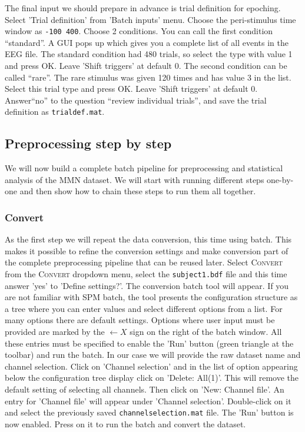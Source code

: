 The final input we should prepare in advance is trial definition for epoching. Select 'Trial definition' from 'Batch inputs' menu.  Choose the peri-stimulus time window as \texttt{-100 400}. Choose 2 conditions. You can call the first condition ``standard''. A GUI pops up which gives you a complete list of all events in the EEG file. The standard condition had 480 trials, so select the type with value 1 and press OK. Leave 'Shift triggers' at default 0. The second condition can be called ``rare''. The rare stimulus was given 120 times and has value 3 in the list. Select this trial type and press OK.  Leave 'Shift triggers' at default 0.  Answer``no'' to the question  ``review individual trials'', and  save the trial definition as \texttt{trialdef.mat}.

\subsection{Preprocessing step by step}

We will now build a complete batch pipeline for preprocessing and statistical analysis of the MMN dataset. We will start with running different steps one-by-one and then show how to chain these steps to run them all together.

\subsubsection{Convert}
As the first step we will repeat the data conversion, this time using batch. This makes it possible to refine the conversion settings and make conversion part of the complete preprocessing pipeline that can be reused later. Select \textsc{Convert} from the \textsc{Convert} dropdown menu, select the \texttt{subject1.bdf} file and this time answer 'yes' to 'Define settings?'. The conversion batch tool will appear. If you are not familiar with SPM batch, the tool presents the configuration structure as a tree where you can enter values and select different options from a list. For many options there are default settings. Options where user input must be provided are marked by the $\leftarrow X$ sign on the right of the batch window. All these entries must be specified to enable the 'Run' button (green triangle at the toolbar) and run the batch. In our case we will provide the raw dataset name and channel selection. Click on 'Channel selection' and in the list of option appearing below the configuration tree display click on 'Delete: All(1)'. This will remove the default setting of selecting all channels. Then click on 'New: Channel file'. An entry for 'Channel file' will appear under 'Channel selection'. Double-click on it and select the previously saved \texttt{channelselection.mat} file. The 'Run' button is now enabled. Press on it to run the batch and convert the dataset.

